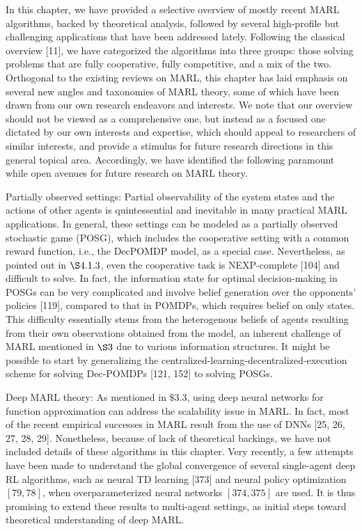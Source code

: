 \documentclass[10pt]{article}
\begin{document}
In this chapter, we have provided a selective overview of mostly recent MARL algorithms, backed by theoretical analysis, followed by several high-profile but challenging applications that have been addressed lately. Following the classical overview [11], we have categorized the algorithms into three groups: those solving problems that are fully cooperative, fully competitive, and a mix of the two. Orthogonal to the existing reviews on MARL, this chapter has laid emphasis on several new angles and taxonomies of MARL theory, some of which have been drawn from our own research endeavors and interests. We note that our overview should not be viewed as a comprehensive one, but instead as a focused one dictated by our own interests and expertise, which should appeal to researchers of similar interests, and provide a stimulus for future research directions in this general topical area. Accordingly, we have identified the following paramount while open avenues for future research on MARL theory.

Partially observed settings: Partial observability of the system states and the actions of other agents is quintessential and inevitable in many practical MARL applications. In general, these settings can be modeled as a partially observed stochastic game (POSG), which includes the cooperative setting with a common reward function, i.e., the DecPOMDP model, as a special case. Nevertheless, as pointed out in $\S 4.1 .3$, even the cooperative task is NEXP-complete [104] and difficult to solve. In fact, the information state for optimal decision-making in POSGs can be very complicated and involve belief generation over the opponents' policies [119], compared to that in POMDPs, which requires belief on only states. This difficulty essentially stems from the heterogenous beliefs of agents resulting from their own observations obtained from the model, an inherent challenge of MARL mentioned in $\S 3$ due to various information structures. It might be possible to start by generalizing the centralized-learning-decentralized-execution scheme for solving Dec-POMDPs [121, 152] to solving POSGs.

Deep MARL theory: As mentioned in $\$ 3.3$, using deep neural networks for function approximation can address the scalability issue in MARL. In fact, most of the recent empirical successes in MARL result from the use of DNNs [25, 26, 27, 28, 29]. Nonetheless, because of lack of theoretical backings, we have not included details of these algorithms in this chapter. Very recently, a few attempts have been made to understand the global convergence of several single-agent deep RL algorithms, such as neural TD learning [373] and neural policy optimization $[79,78]$, when overparameterized neural networks $[374,375]$ are used. It is thus promising to extend these results to multi-agent settings, as initial steps toward theoretical understanding of deep MARL.
\end{document}
